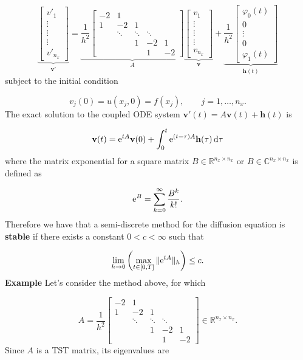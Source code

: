 \documentclass[12pt,a4paper]{article}
\begin{document}
\[
\underbrace{\begin{bmatrix}
v'_{1} \\
\vdots \\
\vdots \\
\vdots \\
v'_{n_x}
\end{bmatrix}}_{\mathbf{v}'} = 
\underbrace{\frac{1}{h^2}\begin{bmatrix}
- 2 & 1 & & & \\
1  & -2 & 1  & & \\
      & \ddots & \ddots & \ddots & \\
      &        & 1    & -2 & 1 \\
      &        &        & 1 & -2
\end{bmatrix}}_{A}
\underbrace{\begin{bmatrix}
v_{1} \\
\vdots \\
\vdots \\
\vdots \\
v_{n_x}
\end{bmatrix}}_{\mathbf{v}}
+ 
\underbrace{\frac{1}{h^2}\begin{bmatrix}
\varphi_0(t) \\
0 \\
\vdots \\
0 \\
 \varphi_1(t)
\end{bmatrix}}_{\mathbf{h}(t)}
\]
subject to the initial condition

\[
v_j(0) = u(x_j,0) = f(x_j), \qquad j = 1, \ldots, n_x.
\]
The exact solution to the coupled ODE system $\mathbf{v}'(t) = A\mathbf{v}(t) + \mathbf{h}(t)$ is

\[
\mathbf{v}(t) = {\rm e}^{tA}\mathbf{v}(0) + \int_0^t {\rm e}^{(t - \tau)A}\mathbf{h}(\tau)\,{\rm d}\tau
\]
where the matrix exponential for a square matrix $B \in \mathbb{R}^{n_x \times n_x}$ or $B \in \mathbb{C}^{n_x \times n_x}$ is defined as

\[
    {\rm e}^{B} = \sum_{k=0}^{\infty}\frac{B^k}{k!}.
\]
Therefore we have that a semi-discrete method for the diffusion equation is \textbf{stable} if there exists a constant $0 <c < \infty$ such that

\[
\lim_{h \to 0}\left(\max_{t \in [0, T]}\| {\rm e}^{tA}\|_h \right) \leq c.
\]
\textbf{Example} Let's consider the method above, for which 

\[
A = \frac{1}{h^2}\begin{bmatrix}
- 2 & 1 & & & \\
1  & -2 & 1  & & \\
      & \ddots & \ddots & \ddots & \\
      &        & 1    & -2 & 1 \\
      &        &        & 1 & -2
\end{bmatrix} \in \mathbb{R}^{n_x \times n_x}.
\]
Since $A$ is a TST matrix, its eigenvalues are
\end{document}
